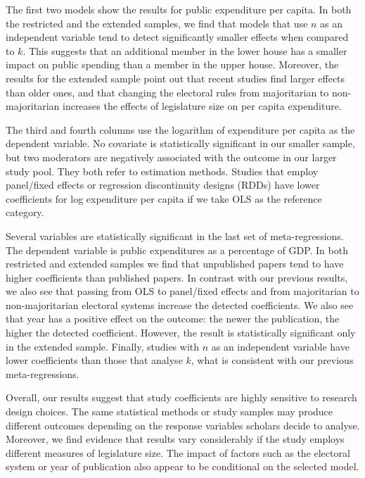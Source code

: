 \documentclass[a4paper,12pt]{article}
\begin{document}
\newpage

The first two models show the results for public expenditure per capita. In both
the restricted and the extended samples, we find that models that use $n$ as an
independent variable tend to detect significantly smaller effects when compared
to $k$. This suggests that an additional member in the lower house has a smaller
impact on public spending than a member in the upper house. Moreover, the
results for the extended sample point out that recent studies find larger
effects than older ones, and that changing the electoral rules from majoritarian
to non-majoritarian increases the effects of legislature size on per capita
expenditure.

The third and fourth columns use the logarithm of expenditure per capita as the
dependent variable. No covariate is statistically significant in our smaller
sample, but two moderators are negatively associated with the outcome in our
larger study pool. They both refer to estimation methods. Studies that employ
panel/fixed effects or regression discontinuity designs (RDDs) have lower
coefficients for log expenditure per capita if we take OLS as the reference
category.

Several variables are statistically significant in the last set of
meta-regressions. The dependent variable is public expenditures as a percentage
of GDP. In both restricted and extended samples we find that unpublished papers
tend to have higher coefficients than published papers. In contrast with our
previous results, we also see that passing from OLS to panel/fixed effects and
from majoritarian to non-majoritarian electoral systems increase the detected
coefficients. We also see that year has a positive effect on the outcome: the
newer the publication, the higher the detected coefficient. However, the
result is statistically significant only in the extended sample. Finally,
studies with $n$ as an independent variable have lower coefficients than those
that analyse $k$, what is consistent with our previous meta-regressions.

Overall, our results suggest that study coefficients are highly sensitive to
research design choices. The same statistical methods or study samples may
produce different outcomes depending on the response variables scholars decide
to analyse. Moreover, we find evidence that results vary considerably if the
study employs different measures of legislature size. The impact of factors such
as the electoral system or year of publication also appear to be conditional on
the selected model.
\end{document}
